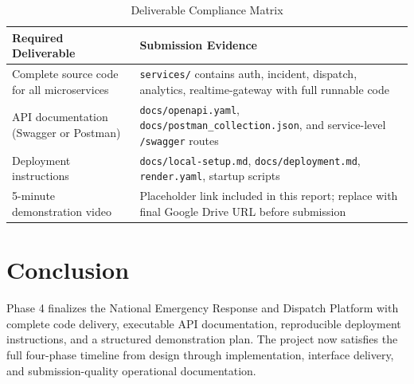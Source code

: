 \documentclass[12pt,a4paper]{report}
\begin{document}
\begin{table}[H]
\centering\small
\caption{Deliverable Compliance Matrix}
\begin{tabular}{|p{5.1cm}|p{8.3cm}|}
\hline
\textbf{Required Deliverable} & \textbf{Submission Evidence} \\
\hline
Complete source code for all microservices & \texttt{services/} contains auth, incident, dispatch, analytics, realtime-gateway with full runnable code \\
\hline
API documentation (Swagger or Postman) & \texttt{docs/openapi.yaml}, \texttt{docs/postman\_collection.json}, and service-level \texttt{/swagger} routes \\
\hline
Deployment instructions & \texttt{docs/local-setup.md}, \texttt{docs/deployment.md}, \texttt{render.yaml}, startup scripts \\
\hline
5-minute demonstration video & Placeholder link included in this report; replace with final Google Drive URL before submission \\
\hline
\end{tabular}
\end{table}

\section{Conclusion}

Phase 4 finalizes the National Emergency Response and Dispatch Platform with complete code delivery, executable API documentation, reproducible deployment instructions, and a structured demonstration plan. The project now satisfies the full four-phase timeline from design through implementation, interface delivery, and submission-quality operational documentation.
\end{document}
